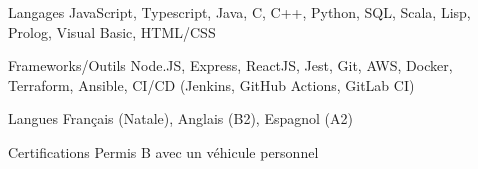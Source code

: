 
\begin{cvskills}
  \cvskill
    {Langages} %
    {JavaScript, Typescript, Java, C, C++, Python, SQL, Scala, Lisp, Prolog, Visual Basic, HTML/CSS} %

  \cvskill
    {Frameworks/Outils} %
    {Node.JS, Express, ReactJS, Jest, Git, AWS, Docker, Terraform, Ansible, CI/CD (Jenkins, GitHub Actions, GitLab CI)} %
    
  \cvskill
    {Langues} %
    {Français (Natale), Anglais (B2), Espagnol (A2)} %
    
  \cvskill
    {Certifications} %
    {Permis B avec un véhicule personnel} %
\end{cvskills}
